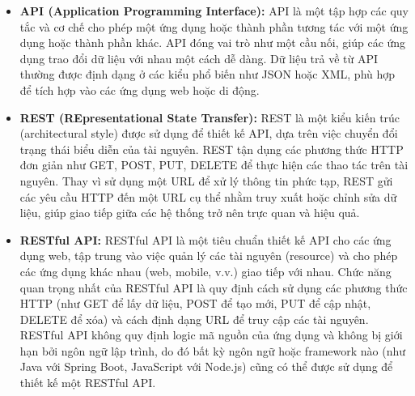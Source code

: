 \begin{itemize}
    \item \textbf{API (Application Programming Interface):} API là một tập hợp các quy tắc và cơ chế cho phép một ứng dụng hoặc thành phần tương tác với một ứng dụng hoặc thành phần khác. API đóng vai trò như một cầu nối, giúp các ứng dụng trao đổi dữ liệu với nhau một cách dễ dàng. Dữ liệu trả về từ API thường được định dạng ở các kiểu phổ biến như JSON hoặc XML, phù hợp để tích hợp vào các ứng dụng web hoặc di động.
    
    \item \textbf{REST (REpresentational State Transfer):} REST là một kiểu kiến trúc (architectural style) được sử dụng để thiết kế API, dựa trên việc chuyển đổi trạng thái biểu diễn của tài nguyên. REST tận dụng các phương thức HTTP đơn giản như GET, POST, PUT, DELETE để thực hiện các thao tác trên tài nguyên. Thay vì sử dụng một URL để xử lý thông tin phức tạp, REST gửi các yêu cầu HTTP đến một URL cụ thể nhằm truy xuất hoặc chỉnh sửa dữ liệu, giúp giao tiếp giữa các hệ thống trở nên trực quan và hiệu quả.
    
    \item \textbf{RESTful API:} RESTful API là một tiêu chuẩn thiết kế API cho các ứng dụng web, tập trung vào việc quản lý các tài nguyên (resource) và cho phép các ứng dụng khác nhau (web, mobile, v.v.) giao tiếp với nhau. Chức năng quan trọng nhất của RESTful API là quy định cách sử dụng các phương thức HTTP (như GET để lấy dữ liệu, POST để tạo mới, PUT để cập nhật, DELETE để xóa) và cách định dạng URL để truy cập các tài nguyên. RESTful API không quy định logic mã nguồn của ứng dụng và không bị giới hạn bởi ngôn ngữ lập trình, do đó bất kỳ ngôn ngữ hoặc framework nào (như Java với Spring Boot, JavaScript với Node.js) cũng có thể được sử dụng để thiết kế một RESTful API.
\end{itemize}

